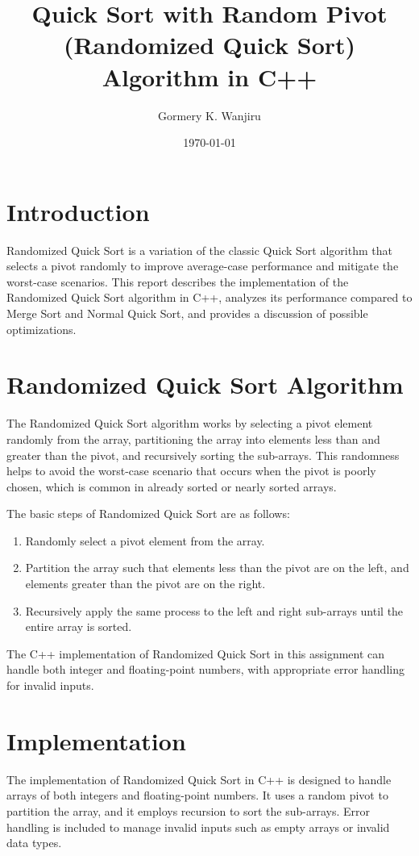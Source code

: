 \documentclass{article}
\title{Quick Sort with Random Pivot (Randomized Quick Sort) Algorithm in C++}
\author{Gormery K. Wanjiru}
\date{\today}
\begin{document}
\maketitle

\section{Introduction}
Randomized Quick Sort is a variation of the classic Quick Sort algorithm that selects a pivot randomly to improve average-case performance and mitigate the worst-case scenarios. This report describes the implementation of the Randomized Quick Sort algorithm in C++, analyzes its performance compared to Merge Sort and Normal Quick Sort, and provides a discussion of possible optimizations.

\section{Randomized Quick Sort Algorithm}
The Randomized Quick Sort algorithm works by selecting a pivot element randomly from the array, partitioning the array into elements less than and greater than the pivot, and recursively sorting the sub-arrays. This randomness helps to avoid the worst-case scenario that occurs when the pivot is poorly chosen, which is common in already sorted or nearly sorted arrays.

The basic steps of Randomized Quick Sort are as follows:
\begin{enumerate}
    \item Randomly select a pivot element from the array.
    \item Partition the array such that elements less than the pivot are on the left, and elements greater than the pivot are on the right.
    \item Recursively apply the same process to the left and right sub-arrays until the entire array is sorted.
\end{enumerate}

The C++ implementation of Randomized Quick Sort in this assignment can handle both integer and floating-point numbers, with appropriate error handling for invalid inputs.

\section{Implementation}
The implementation of Randomized Quick Sort in C++ is designed to handle arrays of both integers and floating-point numbers. It uses a random pivot to partition the array, and it employs recursion to sort the sub-arrays. Error handling is included to manage invalid inputs such as empty arrays or invalid data types.
\end{document}
